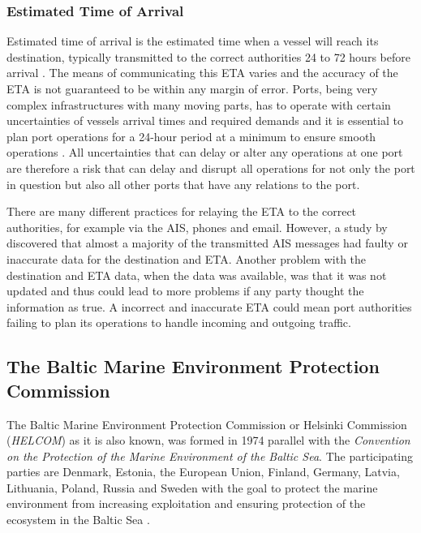 \documentclass[../main.tex]{subfiles}
\begin{document}
\subsubsection{Estimated Time of Arrival}

Estimated time of arrival is the estimated time when a vessel will reach its destination, typically transmitted to the correct authorities 24 to 72 hours before arrival \cite{Veenstra_2021, EU_2009}. The means of communicating this ETA varies and the accuracy of the ETA is not guaranteed to be within any margin of error. Ports, being very complex infrastructures with many moving parts, has to operate with certain uncertainties of vessels arrival times and required demands and it is essential to plan port operations for a 24-hour period at a minimum to ensure smooth operations \cite{Fancello_2011}. All uncertainties that can delay or alter any operations at one port are therefore a risk that can delay and disrupt all operations for not only the port in question but also all other ports that have any relations to the port.

There are many different practices for relaying the ETA to the correct authorities, for example via the AIS, phones and email. However, a study by  \cite{Mokhtari_2008} discovered that almost a majority of the transmitted AIS messages had faulty or inaccurate data for the destination and ETA. Another problem with the destination and ETA data, when the data was available, was that it was not updated and thus could lead to more problems if any party thought the information as true. A incorrect and inaccurate ETA could mean port authorities failing to plan its operations to handle incoming and outgoing traffic.

\subsection{The Baltic Marine Environment Protection Commission}

The Baltic Marine Environment Protection Commission or Helsinki Commission (\textit{HELCOM}) as it is also known, was formed in 1974 parallel with the \textit{Convention on the Protection of the Marine Environment of the Baltic Sea}. The participating parties are Denmark, Estonia, the European Union, Finland, Germany, Latvia, Lithuania, Poland, Russia and Sweden with the goal to protect the marine environment from increasing exploitation and ensuring protection of the ecosystem in the Baltic Sea \cite{HELCOM_2014}.
\end{document}

